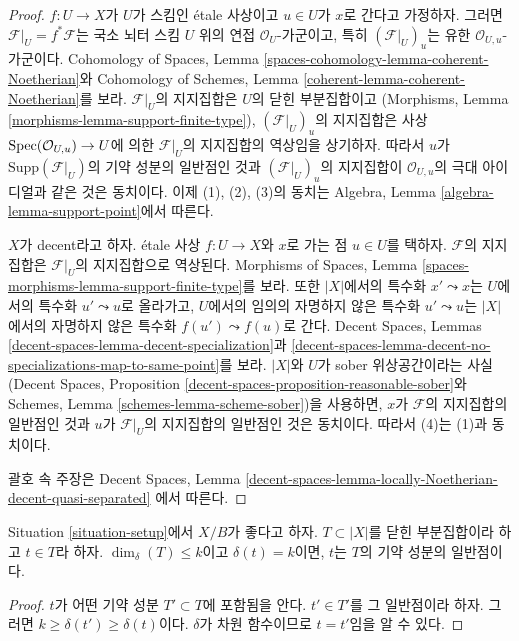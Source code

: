 \begin{proof}
$f : U \to X$가 $U$가 스킴인 \'etale 사상이고 $u \in U$가 $x$로
간다고 가정하자. 그러면 $\mathcal{F}|_U = f^*\mathcal{F}$는 국소 뇌터
스킴 $U$ 위의 연접 $\mathcal{O}_U$-가군이고, 특히
$(\mathcal{F}|_U)_u$는 유한 $\mathcal{O}_{U, u}$-가군이다.
Cohomology of Spaces, Lemma
\ref{spaces-cohomology-lemma-coherent-Noetherian}와
Cohomology of Schemes, Lemma
\ref{coherent-lemma-coherent-Noetherian}를 보라.
$\mathcal{F}|_U$의 지지집합은 $U$의 닫힌 부분집합이고
(Morphisms, Lemma \ref{morphisms-lemma-support-finite-type}),
$(\mathcal{F}|_U)_u$의 지지집합은 사상
$\mathop{\mathrm{Spec}}(\mathcal{O}_{U, u}) \to U$에 의한 $\mathcal{F}|_U$의
지지집합의 역상임을 상기하자. 따라서 $u$가
$\text{Supp}(\mathcal{F}|_U)$의 기약 성분의 일반점인 것과
$(\mathcal{F}|_U)_u$의 지지집합이 $\mathcal{O}_{U, u}$의 극대 아이디얼과
같은 것은 동치이다. 이제 (1), (2), (3)의 동치는
Algebra, Lemma \ref{algebra-lemma-support-point}에서 따른다.

\medskip\noindent
$X$가 decent라고 하자. \'etale 사상 $f : U \to X$와 $x$로 가는 점
$u \in U$를 택하자. $\mathcal{F}$의 지지집합은
$\mathcal{F}|_U$의 지지집합으로 역상된다. Morphisms of Spaces, Lemma
\ref{spaces-morphisms-lemma-support-finite-type}를 보라.
또한 $|X|$에서의 특수화 $x' \leadsto x$는 $U$에서의 특수화
$u' \leadsto u$로 올라가고, $U$에서의 임의의 자명하지 않은 특수화
$u' \leadsto u$는 $|X|$에서의 자명하지 않은 특수화
$f(u') \leadsto f(u)$로 간다. Decent Spaces, Lemmas
\ref{decent-spaces-lemma-decent-specialization}과
\ref{decent-spaces-lemma-decent-no-specializations-map-to-same-point}를 보라.
$|X|$와 $U$가 sober 위상공간이라는 사실
(Decent Spaces, Proposition
\ref{decent-spaces-proposition-reasonable-sober}와
Schemes, Lemma \ref{schemes-lemma-scheme-sober})을 사용하면,
$x$가 $\mathcal{F}$의 지지집합의 일반점인 것과 $u$가
$\mathcal{F}|_U$의 지지집합의 일반점인 것은 동치이다.
따라서 (4)는 (1)과 동치이다.

\medskip\noindent
괄호 속 주장은 Decent Spaces, Lemma
\ref{decent-spaces-lemma-locally-Noetherian-decent-quasi-separated}
에서 따른다.
\end{proof}

\begin{lemma}
\label{lemma-point-of-max-dimension}
Situation \ref{situation-setup}에서 $X/B$가 좋다고 하자.
$T \subset |X|$를 닫힌 부분집합이라 하고 $t \in T$라 하자.
$\dim_\delta(T) \leq k$이고 $\delta(t) = k$이면,
$t$는 $T$의 기약 성분의 일반점이다.
\end{lemma}

\begin{proof}
$t$가 어떤 기약 성분 $T' \subset T$에 포함됨을 안다.
$t' \in T'$를 그 일반점이라 하자. 그러면
$k \geq \delta(t') \geq \delta(t)$이다. $\delta$가 차원 함수이므로
$t = t'$임을 알 수 있다.
\end{proof}


